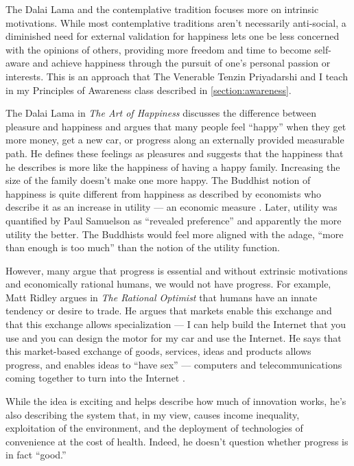 The Dalai Lama and the contemplative tradition focuses more on intrinsic motivations. While most contemplative traditions aren't necessarily anti-social, a diminished need for external validation for happiness lets one be less concerned with the opinions of others, providing more freedom and time to become self-aware and achieve happiness through the pursuit of one's personal passion or interests. This is an approach that The Venerable Tenzin Priyadarshi and I teach in my Principles of Awareness class described in \autoref{section:awareness}.

The Dalai Lama in \emph{The Art of Happiness} discusses the difference between pleasure and happiness and argues that many people feel ``happy'' when they get more money, get a new car, or progress along an externally provided measurable path. He defines these feelings as pleasures and suggests that the happiness that he describes is more like the happiness of having a happy family. Increasing the size of the family doesn't make one more happy. The Buddhist notion of happiness is quite different from happiness as described by economists who describe it as an increase in utility --- an economic measure \cite{marshall1961principles}. Later, utility was quantified by Paul Samuelson as ``revealed preference'' \cite{samuelson1948consumption} and apparently the more utility the better. The Buddhists would feel more aligned with the adage, ``more than enough is too much'' than the notion of the utility function.

However, many argue that progress is essential and without extrinsic motivations and economically rational humans, we would not have progress. For example, Matt Ridley argues in \emph{The Rational Optimist} that humans have an innate tendency or desire to trade. He argues that markets enable this exchange and that this exchange allows specialization --- I can help build the Internet that you use and you can design the motor for my car and use the Internet. He says that this market-based exchange of goods, services, ideas and products allows progress, and enables ideas to ``have sex'' --- computers and telecommunications coming together to turn into the Internet \cite{ridley_rational_2010}.

While the idea is exciting and helps describe how much of innovation works, he's also describing the system that, in my view, causes income inequality, exploitation of the environment, and the deployment of technologies of convenience at the cost of health. Indeed, he doesn't question whether progress is in fact ``good.''

